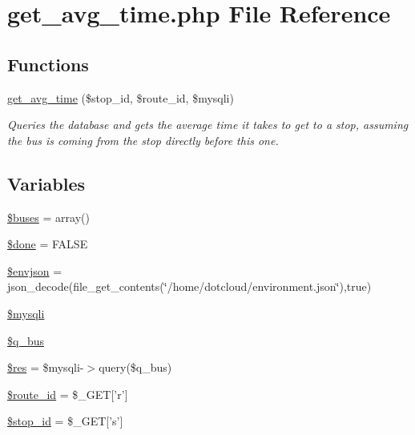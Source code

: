 \hypertarget{get__avg__time_8php}{
\section{get\_\-avg\_\-time.php File Reference}
\label{get__avg__time_8php}
}
\subsection*{Functions}
\begin{DoxyCompactItemize}
\item 
\hyperlink{get__avg__time_8php_abbac276c7f4e5bdd57c7e02000863656_abbac276c7f4e5bdd57c7e02000863656}{get\_\-avg\_\-time} (\$stop\_\-id, \$route\_\-id, \$mysqli)
\begin{DoxyCompactList}\small\item\em Queries the database and gets the average time it takes to get to a stop, assuming the bus is coming from the stop directly before this one. \end{DoxyCompactList}\end{DoxyCompactItemize}
\subsection*{Variables}
\begin{DoxyCompactItemize}
\item 
\hyperlink{get__avg__time_8php_ae7ef8ab0940cf7a7e9a8a2bb0f3b47b0_ae7ef8ab0940cf7a7e9a8a2bb0f3b47b0}{\$buses} = array()
\item 
\hyperlink{get__avg__time_8php_a2698dc52f06950fcdbaca1e94f88c1ff_a2698dc52f06950fcdbaca1e94f88c1ff}{\$done} = FALSE
\item 
\hyperlink{get__avg__time_8php_a22377fbdee6b0aad7e6e4b043f2b6603_a22377fbdee6b0aad7e6e4b043f2b6603}{\$envjson} = json\_\-decode(file\_\-get\_\-contents(\char`\"{}/home/dotcloud/environment.json\char`\"{}),true)
\item 
\hyperlink{get__avg__time_8php_a580989e8e3521433691a0351287f6315_a580989e8e3521433691a0351287f6315}{\$mysqli}
\item 
\hyperlink{get__avg__time_8php_a531a3cdb9017f75f6acb74a688f1ceeb_a531a3cdb9017f75f6acb74a688f1ceeb}{\$q\_\-bus}
\item 
\hyperlink{get__avg__time_8php_a49a8a4009b02e49717caa88b128affc5_a49a8a4009b02e49717caa88b128affc5}{\$res} = \$mysqli-\/$>$query(\$q\_\-bus)
\item 
\hyperlink{get__avg__time_8php_a053b1e7578c0ad2a0dd68068b071f3ed_a053b1e7578c0ad2a0dd68068b071f3ed}{\$route\_\-id} = \$\_\-GET\mbox{[}'r'\mbox{]}
\item 
\hyperlink{get__avg__time_8php_addc5e9981ac50c577e366f562a9382fe_addc5e9981ac50c577e366f562a9382fe}{\$stop\_\-id} = \$\_\-GET\mbox{[}'s'\mbox{]}
\end{DoxyCompactItemize}


